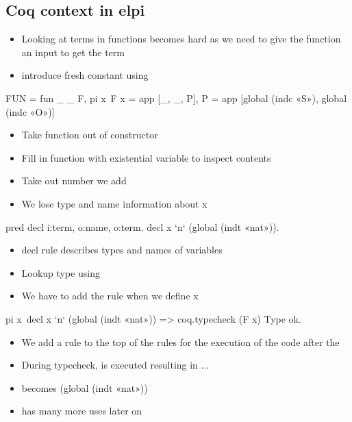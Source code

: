 \documentclass[thesis.tex]{subfiles}
\begin{document}
{\subsection{Coq context in elpi}
\begin{itemize}
  \item Looking at terms in functions becomes hard as we need to give the function an input to get the term
  \item introduce fresh constant using 
\end{itemize}
\begin{elpicode}
  FUN = fun _ _ F,
  pi x\ F x = app [_, _, P],
  P = app [global (indc «S»), global (indc «O»)]
\end{elpicode}
\begin{itemize}
  \item Take function out of constructor
  \item Fill in function with existential variable to inspect contents
  \item Take out number we add
  \item We lose type and name information about x
\end{itemize}
\begin{elpicode}
  pred decl i:term, o:name, o:term.
  decl x `n` (global (indt «nat»)).
\end{elpicode}
\begin{itemize}
  \item decl rule describes types and names of variables
  \item Lookup type using 
  \item We have to add the rule when we define x
\end{itemize}
\begin{elpicode}
  pi x\ decl x `n` (global (indt «nat»)) 
          => coq.typecheck (F x) Type ok.
\end{elpicode}
\begin{itemize}
  \item We add a rule to the top of the rules for the execution of the code after the \elpiinline{=>}
  \item During typecheck,  is executed resulting in ...
  \item {} becomes (global (indt «nat»))
  \item \elpiinline{=>} has many more uses later on
\end{itemize}

}
\end{document}
